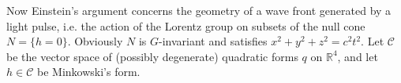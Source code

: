 \documentclass[12pt]{amsart}
\theoremstyle{definition}
\theoremstyle{remark}
\newcommand{\bR}{\mathbb{R}}
\newcommand{\sC}{\mathscr{C}}
\begin{document}
Now Einstein's argument concerns the geometry of a wave front generated by a light pulse, i.e. the action of the Lorentz group on subsets of the null cone $N=\{h=0\}$. Obviously $N$ is $G$-invariant and satisfies $x^2+y^2+z^2=c^2 t^2$. Let $\sC$ be the vector space of (possibly degenerate) quadratic forms $q$ on $\bR^4$, and let $h\in \sC$ be Minkowski's form. 







\end{document}
